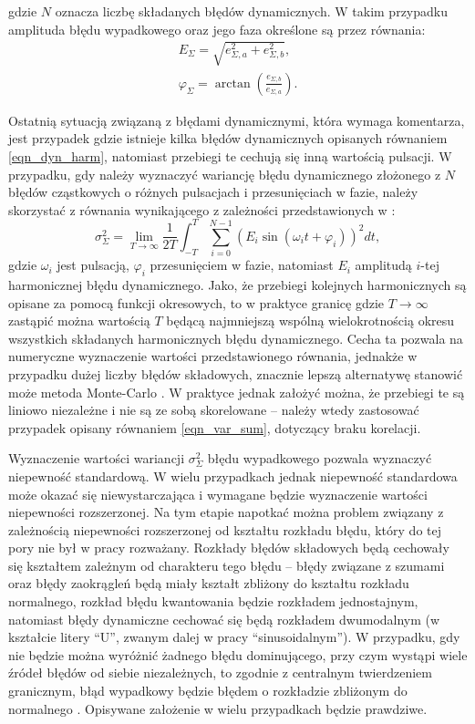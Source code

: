 gdzie $N$ oznacza liczbę składanych błędów dynamicznych. W takim przypadku amplituda błędu wypadkowego oraz jego faza określone są przez równania:
\begin{gather}
E_{\Sigma} = \sqrt{e_{\Sigma,a}^2 + e_{\Sigma,b}^2} \label{eqn_dyn_vect_amp}, \\
\varphi_{\Sigma} = \arctan \left( \frac{e_{\Sigma,b}}{e_{\Sigma,a}} \right) \label{eqn_dyn_vect_phi}.
\end{gather}

Ostatnią sytuacją związaną z błędami dynamicznymi, która wymaga komentarza, jest przypadek gdzie istnieje kilka błędów dynamicznych opisanych równaniem \eqref{eqn_dyn_harm}, natomiast przebiegi te cechują się inną wartością pulsacji. W przypadku, gdy należy wyznaczyć wariancję błędu dynamicznego złożonego z $N$ błędów cząstkowych o różnych pulsacjach i przesunięciach w fazie, należy skorzystać z równania wynikającego z zależności przedstawionych w \cite{proakis_dsp}:
\begin{equation}
\sigma_{\Sigma}^{2} = \lim _{T \to \infty} \frac{1}{2T} \int _{-T} ^{T} \sum _{i = 0} ^{N -1} \left( E_{i} \sin \left( \omega_{i} t + \varphi_{i} \right) \right)^{2} dt \label{eqn_dyn_multi},
\end{equation}
gdzie $\omega_{i}$ jest pulsacją, $\varphi_{i}$ przesunięciem w fazie, natomiast $E_{i}$ amplitudą $i$-tej harmonicznej błędu dynamicznego. Jako, że przebiegi kolejnych harmonicznych są opisane za pomocą funkcji okresowych, to w praktyce granicę gdzie $T \to \infty$ zastąpić można wartością $T$ będącą najmniejszą wspólną wielokrotnością okresu wszystkich składanych harmonicznych błędu dynamicznego. Cecha ta pozwala na numeryczne wyznaczenie wartości przedstawionego równania, jednakże w przypadku dużej liczby błędów składowych, znacznie lepszą alternatywę stanowić może metoda Monte-Carlo \cite{roj_annuncertainty, janssen_montecarlo}. W praktyce jednak założyć można, że przebiegi te są liniowo niezależne i nie są ze sobą skorelowane \cite{proakis_dsp} -- należy wtedy zastosować przypadek opisany równaniem \eqref{eqn_var_sum}, dotyczący braku korelacji.

Wyznaczenie wartości wariancji $\sigma_{\Sigma}^{2}$ błędu wypadkowego pozwala wyznaczyć niepewność standardową. W wielu przypadkach jednak niepewność standardowa może okazać się niewystarczająca i wymagane będzie wyznaczenie wartości niepewności rozszerzonej. Na tym etapie napotkać można problem związany z zależnością niepewności rozszerzonej od kształtu rozkładu błędu, który do tej pory nie był w pracy rozważany. Rozkłady błędów składowych będą cechowały się kształtem zależnym od charakteru tego błędu -- błędy związane z szumami oraz błędy zaokrągleń będą miały kształt zbliżony do kształtu rozkładu normalnego, rozkład błędu kwantowania będzie rozkładem jednostajnym, natomiast błędy dynamiczne cechować się będą rozkładem dwumodalnym (w kształcie litery \enquote{U}, zwanym dalej w pracy \enquote{sinusoidalnym}). W przypadku, gdy nie będzie można wyróżnić żadnego błędu dominującego, przy czym wystąpi wiele źródeł błędów od siebie niezależnych, to zgodnie z centralnym twierdzeniem granicznym, błąd wypadkowy będzie błędem o rozkładzie zbliżonym do normalnego \cite{jcgm_guide}. Opisywane założenie w wielu przypadkach będzie prawdziwe.

